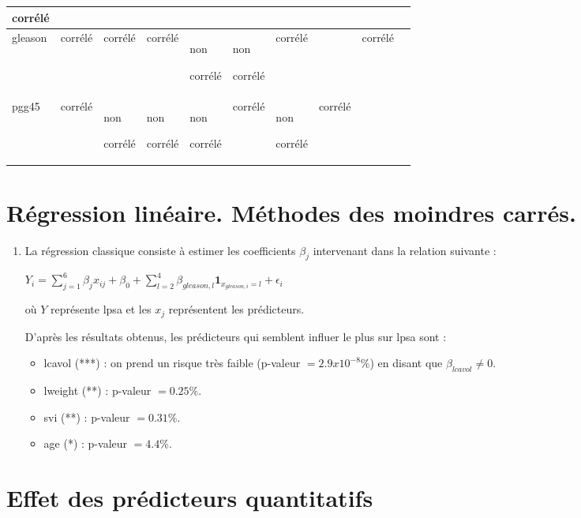 \documentclass[a4paper, 12pt]{article}
\begin{document}
\begin{enumerate}
\begin{tabular}{|p{1.4cm}|p{1.4cm}|p{1.4cm}|p{1.4cm}|p{1.4cm}|p{1.4cm}|p{1.4cm}|p{1.4cm}|p{1.4cm}|p{1.4cm}|}
    corrélé \\
    \hline
    gleason & corrélé & corrélé & corrélé & non 

    corrélé & non 

    corrélé & corrélé & & corrélé \\
    \hline
    pgg45 & corrélé & non 

    corrélé & non 

    corrélé & non 

    corrélé & corrélé & non 

    corrélé & corrélé & \\
    \hline

\end{tabular}

\end{enumerate}



\section{Régression linéaire. Méthodes des moindres carrés.}

\begin{enumerate}
\item
La régression classique consiste à estimer les coefficients $\beta_{j}$ intervenant dans la relation suivante :

$ Y_{i} = \sum\limits_{j=1}^6 \beta_{j} x_{ij} + \beta_{0} + \sum\limits_{l=2}^4 \beta_{gleason, l} \mathbf{1}_{x_{gleason, i}=l} + \epsilon_{i} $

où $Y$ représente lpsa et les $x_{j}$ représentent les prédicteurs.  

D'après les résultats obtenus, les prédicteurs qui semblent influer le plus sur lpsa sont :
\begin{itemize}
\item lcavol (***) : on prend un risque très faible (p-valeur $=2.9x10^{-8}\%$) en disant que $\beta_{lcavol} \neq 0$.
\item lweight (**) : p-valeur $=0.25\%$.
\item svi (**) : p-valeur $=0.31\%$.
\item age (*) : p-valeur $=4.4\%$.
\end{itemize}




\end{enumerate}

\section{Effet des prédicteurs quantitatifs}
\end{document}
